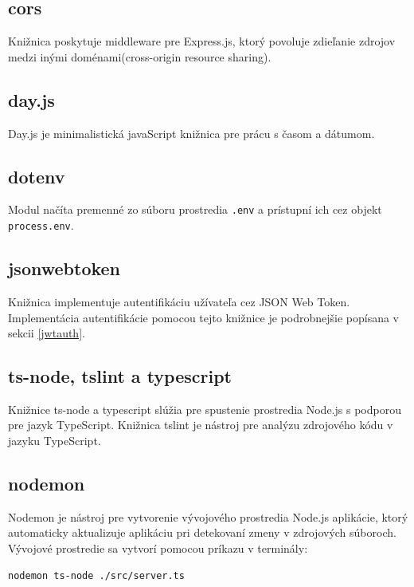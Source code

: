 \subsection*{cors}
Knižnica poskytuje middleware pre Express.js, ktorý povoluje zdieľanie zdrojov medzi inými doménami(cross-origin resource sharing).

\subsection*{day.js}
Day.js je minimalistická javaScript knižnica pre prácu s časom a dátumom.

\subsection*{dotenv}
Modul načíta premenné zo súboru prostredia \texttt{.env} a prístupní ich cez objekt \texttt{process.env}.

\subsection*{jsonwebtoken}
Knižnica implementuje autentifikáciu užívateľa cez JSON Web Token. Implementácia autentifikácie pomocou tejto knižnice je podrobnejšie popísana v sekcii \ref{jwtauth}.

\subsection*{ts-node, tslint a typescript}
Knižnice ts-node a typescript slúžia pre spustenie prostredia Node.js s podporou pre jazyk TypeScript. Knižnica tslint je nástroj pre analýzu zdrojového kódu v jazyku TypeScript.

\subsection*{nodemon}
Nodemon je nástroj pre vytvorenie vývojového prostredia Node.js aplikácie, ktorý automaticky aktualizuje aplikáciu pri detekovaní zmeny v zdrojových súboroch. Vývojové prostredie sa vytvorí pomocou príkazu v terminály:
\begin{verbatim}nodemon ts-node ./src/server.ts
\end{verbatim}
